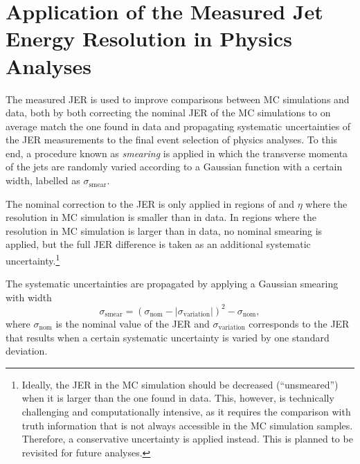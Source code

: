 
\section{Application of the Measured Jet Energy Resolution in Physics Analyses}
\label{sec:jer-in-analysis}
The measured JER is used to improve comparisons between MC simulations and data, both by both correcting the nominal JER of the MC simulations to on average match the one found in data and propagating systematic uncertainties of the JER measurements to the final event selection of physics analyses.
To this end, a procedure known as \emph{smearing} is applied in which the transverse momenta of the jets are randomly varied according to a Gaussian function with a certain width, labelled as $\sigma_{\text{smear}}$.

The nominal correction to the JER is only applied in regions of \pT and $\eta$ where the resolution in MC simulation is smaller than in data. In regions where the resolution in MC simulation is larger than in data, no nominal smearing is applied, but the full JER difference is taken as an additional systematic uncertainty.\footnote{Ideally, the JER in the MC simulation should be decreased (``unsmeared'') when it is larger than the one found in data. This, however, is technically challenging and computationally intensive, as it requires the comparison with truth information that is not always accessible in the MC simulation samples. Therefore, a conservative uncertainty is applied instead. This is planned to be revisited for future analyses.}

The systematic uncertainties are propagated by applying a Gaussian smearing with width
\begin{equation}
    \sigma_{\text{smear}} =  \left( \sigma_{\text{nom}} - |\sigma_{\text{variation}}|   \right)^2  - \sigma_{\text{nom}},
\end{equation}
where $\sigma_{\text{nom}}$ is the nominal value of the JER and $\sigma_{\text{variation}}$ corresponds to the JER that results when a certain systematic uncertainty is varied by one standard deviation.

